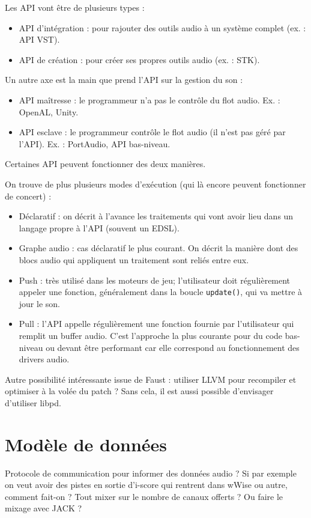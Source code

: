 \documentclass[french,12pt,a4paper]{article}
\begin{document}
Les API vont être de plusieurs types : 
\begin{itemize}
\item API d'intégration : pour rajouter des outils audio à un système complet (ex. : API VST).
\item API de création : pour créer ses propres outils audio (ex. : STK).
\end{itemize}

Un autre axe est la main que prend l'API sur la gestion du son : 
\begin{itemize}
\item API maîtresse : le programmeur n'a pas le contrôle du flot audio. Ex. : OpenAL, Unity.
\item API esclave : le programmeur contrôle le flot audio (il n'est pas géré par l'API). Ex. : PortAudio, API bas-niveau.
\end{itemize}

Certaines API peuvent fonctionner des deux manières.

On trouve de plus plusieurs modes d'exécution (qui là encore peuvent fonctionner de concert) : 
\begin{itemize}    
    \item Déclaratif : on décrit à l'avance les traitements qui vont avoir lieu dans un langage propre à l'API (souvent un \ac{EDSL}).
    \item Graphe audio : cas déclaratif le plus courant.
    On décrit la manière dont des blocs audio qui appliquent un traitement sont reliés entre eux. 
    \item Push : très utilisé dans les moteurs de jeu; l'utilisateur doit régulièrement appeler une fonction, 
    généralement dans la boucle \lstinline{update()}, qui va mettre à jour le son.
    \item Pull : l'API appelle régulièrement une fonction fournie par l'utilisateur qui remplit un buffer audio.
C'est l'approche la plus courante pour du code bas-niveau ou devant être performant car elle correspond 
au fonctionnement des drivers audio.
\end{itemize}


Autre possibilité intéressante issue de Faust : utiliser LLVM pour recompiler et optimiser
à la volée du patch ?
Sans cela, il est aussi possible d'envisager d'utiliser libpd.
\section{Modèle de données}
Protocole de communication pour informer des données audio ? 
Si par exemple on veut avoir des pistes en sortie d'i-score qui rentrent 
dans wWise ou autre, comment fait-on ? 
Tout mixer sur le nombre de canaux offerts ? Ou faire le mixage avec JACK ?
\end{document}
